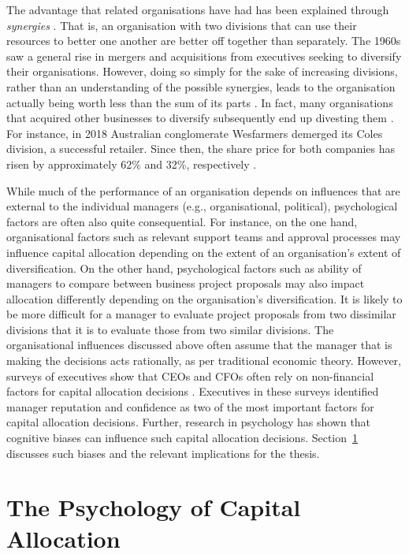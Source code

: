 \documentclass[a4paper, nobind]{templates/ociamthesis}
\theoremstyle{definition}
\theoremstyle{definition}
\theoremstyle{definition}
\theoremstyle{definition}
\theoremstyle{remark}
\begin{document}
The advantage that related organisations have had has been explained through
\emph{synergies} \autocite{barney1988}. That is, an organisation with two divisions that can
use their resources to better one another are better off together than
separately. The 1960s saw a general rise in mergers and acquisitions from
executives seeking to diversify their organisations. However, doing so simply
for the sake of increasing divisions, rather than an understanding of the
possible synergies, leads to the organisation actually being worth less than the
sum of its parts \autocite[known as a \emph{diversification discount};][]{lang1994}. In fact,
many organisations that acquired other businesses to diversify subsequently end
up divesting them \autocite{porter1987}. For instance, in 2018 Australian conglomerate
Wesfarmers demerged its Coles division, a successful retailer. Since then, the
share price for both companies has risen by approximately 62\% and 32\%,
respectively \autocite{boyd2021}.

While much of the performance of an organisation depends on influences that are
external to the individual managers (e.g., organisational, political),
psychological factors are often also quite consequential. For instance, on the
one hand, organisational factors such as relevant support teams and approval
processes may influence capital allocation depending on the extent of an
organisation's extent of diversification. On the other hand, psychological
factors such as ability of managers to compare between business project
proposals may also impact allocation differently depending on the organisation's
diversification. It is likely to be more difficult for a manager to evaluate
project proposals from two dissimilar divisions that it is to evaluate those
from two similar divisions. The organisational influences discussed above often
assume that the manager that is making the decisions acts rationally, as per
traditional economic theory. However, surveys of executives show that CEOs and
CFOs often rely on non-financial factors for capital allocation decisions
\autocite{graham2015}. Executives in these surveys identified manager reputation and
confidence as two of the most important factors for capital allocation
decisions. Further, research in psychology has shown that cognitive biases can
influence such capital allocation decisions. Section~\ref{psychology} discusses
such biases and the relevant implications for the thesis.

\hypertarget{psychology}{%
\section{The Psychology of Capital Allocation}\label{psychology}}
\end{document}
